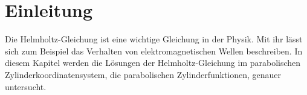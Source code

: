 %
%
%
\section{Einleitung\label{parzyl:section:teil0}}
Die Helmholtz-Gleichung ist eine wichtige Gleichung in der Physik. 
Mit ihr lässt sich zum Beispiel das Verhalten von elektromagnetischen Wellen beschreiben.
In diesem Kapitel werden die Lösungen der Helmholtz-Gleichung im parabolischen Zylinderkoordinatensystem, 
die parabolischen Zylinderfunktionen, genauer untersucht.

